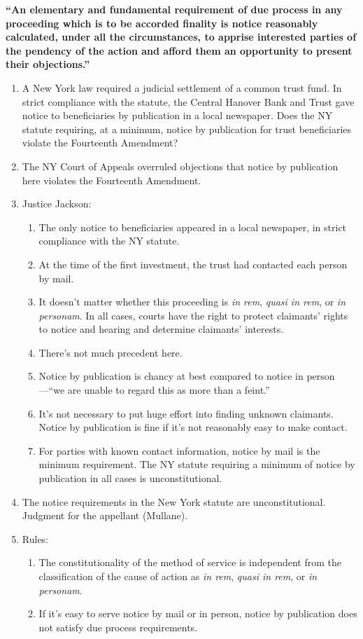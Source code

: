 \textbf{``An elementary and fundamental requirement of due process in any 
proceeding which is to be accorded finality is notice reasonably calculated, 
under all the circumstances, to apprise interested parties of the pendency of 
the action and afford them an opportunity to present their objections.''}

\begin{enumerate}
    \item A New York law required a judicial settlement of a common trust 
    fund.  In strict compliance with the statute, the Central Hanover Bank and 
    Trust gave notice to beneficiaries by publication in a local newspaper. 
    Does the NY statute requiring, at a minimum, notice by publication for 
    trust beneficiaries violate the Fourteenth Amendment?
    \item The NY Court of Appeals overruled objections that notice by 
    publication here violates the Fourteenth Amendment.
    \item Justice Jackson:
    \begin{enumerate}
        \item The only notice to beneficiaries appeared in a local newspaper, 
        in strict compliance with the NY statute.
        \item At the time of the first investment, the trust had contacted 
        each person by mail.
        \item It doesn't matter whether this proceeding is \emph{in rem}, 
        \emph{quasi in rem}, or \emph{in personam}. In all cases, courts have 
        the right to protect claimants' rights to notice and hearing and 
        determine claimants' interests.
        \item There's not much precedent here.
        \item Notice by publication is chancy at best compared to notice in 
        person---``we are unable to regard this as more than a feint.''
        \item It's not necessary to put huge effort into finding unknown 
        claimants. Notice by publication is fine if it's not reasonably easy 
        to make contact.
        \item For parties with known contact information, notice by mail is 
        the minimum requirement. The NY statute requiring a minimum of notice 
        by publication in all cases is unconstitutional.
    \end{enumerate}
    \item The notice requirements in the New York statute are 
    unconstitutional.  Judgment for the appellant (Mullane).
    \item Rules:
    \begin{enumerate}
       \item  The constitutionality of the method of service is independent 
       from the classification of the cause of action as \emph{in rem}, 
       \emph{quasi in rem}, or \emph{in personam}.
        \item If it's easy to serve notice by mail or in person, notice by 
        publication does not satisfy due process requirements.
    \end{enumerate}
\end{enumerate}

